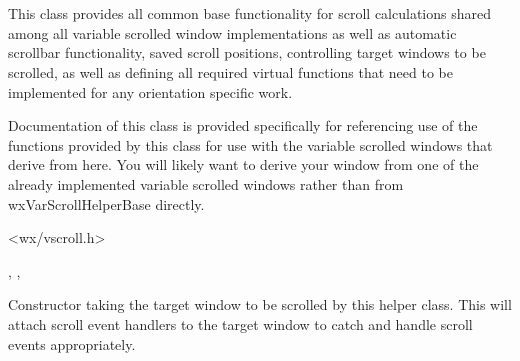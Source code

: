 
\section{}\label{wxvarscrollhelperbase}

This class provides all common base functionality for scroll calculations
shared among all variable scrolled window implementations as well as
automatic scrollbar functionality, saved scroll positions, controlling
target windows to be scrolled, as well as defining all required virtual
functions that need to be implemented for any orientation specific work.

Documentation of this class is provided specifically for referencing use
of the functions provided by this class for use with the variable scrolled
windows that derive from here. You will likely want to derive your window
from one of the already implemented variable scrolled windows rather than
from wxVarScrollHelperBase directly.


<wx/vscroll.h>


,
\rtfsp{},
\rtfsp{}



\label{wxvarscrollhelperbasewxvarscrollhelperbase}


Constructor taking the target window to be scrolled by this helper class.
This will attach scroll event handlers to the target window to catch and
handle scroll events appropriately.


\label{wxvarscrollhelperbasedtor}


